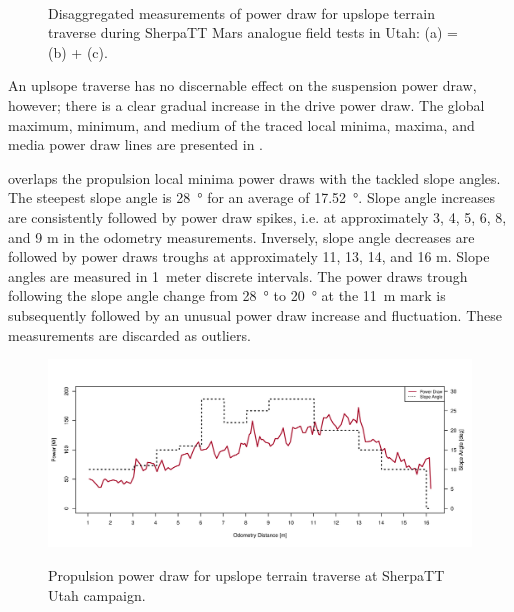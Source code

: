 \begin{figure}[h]
\begin{subfigure}[t]{\subfigureWidth}
		\label{fig:plot:sub:sherpatt-disaggregated-upslope-terrain-power-draw-suspension}
	\end{subfigure}\\[0.8ex]
    \caption[Disaggregated measurements of power draw for upslope terrain traverse]
            {Disaggregated measurements of power draw for upslope terrain traverse during SherpaTT Mars analogue field tests in Utah: (a) = (b) + (c).}
    \label{fig:plot:sherpatt-disaggregated-upslope-terrain-power-draw}
\vspace{-2ex}
\end{figure}

\vspace{0.1cm}

An uplsope traverse has no discernable effect on the suspension power draw, however; there is a clear gradual increase in the drive power draw. The global maximum, minimum, and medium of the traced local minima, maxima, and media power draw lines are presented in .

\vspace{0.1cm}



 overlaps the propulsion local minima power draws with the tackled slope angles. The steepest slope angle is \SI{28}{\degree} for an average of \SI{17.52}{\degree}. Slope angle increases are consistently followed by power draw spikes, i.e. at approximately 3, 4, 5, 6, 8, and 9 \si{\meter} in the odometry measurements. Inversely, slope angle decreases are followed by power draws troughs at approximately 11, 13, 14, and 16 \si{\meter}. Slope angles are measured in \SI{1}{meter} discrete intervals. The power draws trough following the slope angle change from \SI{28}{\degree} to \SI{20}{\degree} at the \SI{11}{\meter} mark is subsequently followed by an unusual power draw increase and fluctuation. These measurements are discarded as outliers.

\begin{figure}[h]
  \centering
  \hypersetup{linkcolor=captionTextColor}
  \includegraphics[width=0.65\linewidth]{sections/power-system-design/power-budget/plots/minima-locomotion-power-draws-on-upslope-terrain.png}\\
  \caption[Propulsion power draw for upslope terrain traverse]
          {Propulsion power draw for upslope terrain traverse at SherpaTT Utah campaign.}
  \label{fig:plot:sherpatt-upslope-terrain-power-draw}
\end{figure}

